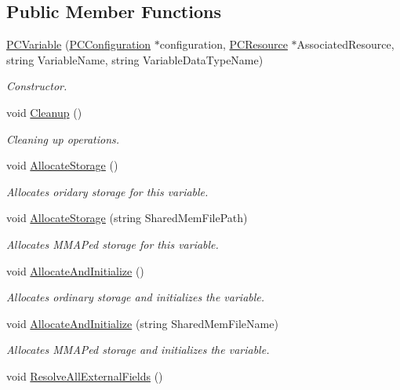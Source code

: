 \subsection*{Public Member Functions}
\begin{DoxyCompactItemize}
\item 
\hyperlink{classpc__emulator_1_1PCVariable_a96143aec6480ffb9ac1002ca76face34}{P\+C\+Variable} (\hyperlink{classpc__emulator_1_1PCConfiguration}{P\+C\+Configuration} $\ast$configuration, \hyperlink{classpc__emulator_1_1PCResource}{P\+C\+Resource} $\ast$Associated\+Resource, string Variable\+Name, string Variable\+Data\+Type\+Name)
\begin{DoxyCompactList}\small\item\em Constructor. \end{DoxyCompactList}\item 
void \hyperlink{classpc__emulator_1_1PCVariable_a175e91c9eb31ebd6b05b308c252214ee}{Cleanup} ()
\begin{DoxyCompactList}\small\item\em Cleaning up operations. \end{DoxyCompactList}\item 
void \hyperlink{classpc__emulator_1_1PCVariable_ae94e1da8e8bfd043ece51b66b630c998}{Allocate\+Storage} ()
\begin{DoxyCompactList}\small\item\em Allocates oridary storage for this variable. \end{DoxyCompactList}\item 
void \hyperlink{classpc__emulator_1_1PCVariable_a035cca1fe01838fe5c1727dbca1a174a}{Allocate\+Storage} (string Shared\+Mem\+File\+Path)
\begin{DoxyCompactList}\small\item\em Allocates M\+M\+AP\textquotesingle{}ed storage for this variable. \end{DoxyCompactList}\item 
void \hyperlink{classpc__emulator_1_1PCVariable_a7523ab18c57a7ec836949c1308a5c335}{Allocate\+And\+Initialize} ()
\begin{DoxyCompactList}\small\item\em Allocates ordinary storage and initializes the variable. \end{DoxyCompactList}\item 
void \hyperlink{classpc__emulator_1_1PCVariable_aa54b8261d0d92ed67f78083c39d995e6}{Allocate\+And\+Initialize} (string Shared\+Mem\+File\+Name)
\begin{DoxyCompactList}\small\item\em Allocates M\+M\+AP\textquotesingle{}ed storage and initializes the variable. \end{DoxyCompactList}\item 
void \hyperlink{classpc__emulator_1_1PCVariable_a84e7c6bba79c8e9ba002e7055ed85c70}{Resolve\+All\+External\+Fields} ()\hypertarget{classpc__emulator_1_1PCVariable_a84e7c6bba79c8e9ba002e7055ed85c70}{}\label{classpc__emulator_1_1PCVariable_a84e7c6bba79c8e9ba002e7055ed85c70}


\end{DoxyCompactItemize}
